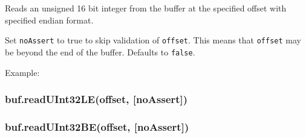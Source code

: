 Reads an unsigned 16 bit integer from the buffer at the specified offset
with specified endian format.

Set \texttt{noAssert} to true to skip validation of \texttt{offset}.
This means that \texttt{offset} may be beyond the end of the buffer.
Defaults to \texttt{false}.

Example:

\begin{Shaded}
\begin{Highlighting}[]
  \NormalTok{(}\NormalTok{);}

\NormalTok{buf[}\NormalTok{] = }\NormalTok{;}
\NormalTok{buf[}\NormalTok{] = }\NormalTok{;}
\NormalTok{buf[}\NormalTok{] = }\NormalTok{;}
\NormalTok{buf[}\NormalTok{] = }\NormalTok{;}

\NormalTok{(}\NormalTok{(}\NormalTok{));}
\NormalTok{(}\NormalTok{(}\NormalTok{));}
\NormalTok{(}\NormalTok{(}\NormalTok{));}
\NormalTok{(}\NormalTok{(}\NormalTok{));}
\NormalTok{(}\NormalTok{(}\NormalTok{));}
\NormalTok{(}\NormalTok{(}\NormalTok{));}

\end{Highlighting}
\end{Shaded}

\subsubsection{buf.readUInt32LE(offset,
{[}noAssert{]})}\label{buf.readuint32leoffset-noassert}

\subsubsection{buf.readUInt32BE(offset,
{[}noAssert{]})}\label{buf.readuint32beoffset-noassert}

